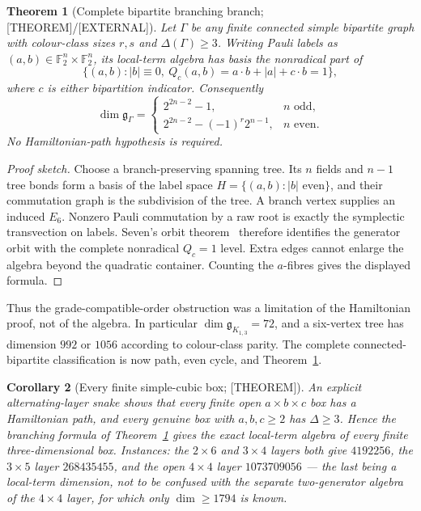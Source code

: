 \documentclass[11pt]{article}
\newtheorem{theorem}{Theorem}[section]
\newtheorem{corollary}[theorem]{Corollary}
\theoremstyle{definition}
\newcommand{\Fb}{\mathbb{F}}
\newcommand{\alg}{\mathfrak{g}}
\begin{document}
\begin{theorem}[Complete bipartite branching branch; {[THEOREM]}/{[EXTERNAL]}]\label{thm:bipcomplete}
Let $\Gamma$ be any finite connected simple bipartite graph with colour-class sizes $r,s$ and
$\Delta(\Gamma)\ge3$. Writing Pauli labels as $(a,b)\in\Fb_2^n\times\Fb_2^n$, its local-term
algebra has basis the nonradical part of
\[
\{(a,b): |b|\equiv0,\ Q_c(a,b)=a\cdot b+|a|+c\cdot b=1\},
\]
where $c$ is either bipartition indicator. Consequently
\[
\dim\alg_\Gamma=
\begin{cases}
2^{2n-2}-1,&n\text{ odd},\\
2^{2n-2}-(-1)^r2^{n-1},&n\text{ even}.
\end{cases}
\]
No Hamiltonian-path hypothesis is required.
\end{theorem}

\begin{proof}[Proof sketch]
Choose a branch-preserving spanning tree. Its $n$ fields and $n-1$ tree bonds form a basis of the
label space $H=\{(a,b):|b|\text{ even}\}$, and their commutation graph is the subdivision of the
tree. A branch vertex supplies an induced $E_6$. Nonzero Pauli commutation by a raw root is exactly
the symplectic transvection on labels. Seven's orbit theorem~\cite{seven2003_transvections} therefore
identifies the generator orbit with the complete nonradical $Q_c=1$ level. Extra edges cannot enlarge
the algebra beyond the quadratic container. Counting the $a$-fibres gives the displayed formula.
\end{proof}

Thus the grade-compatible-order obstruction was a limitation of the Hamiltonian proof, not of the
algebra. In particular $\dim\alg_{K_{1,3}}=72$, and a six-vertex tree has dimension $992$ or $1056$
according to colour-class parity. The complete connected-bipartite classification is now path,
even cycle, and Theorem~\ref{thm:bipcomplete}.

\begin{corollary}[Every finite simple-cubic box; {[THEOREM]}]\label{cor:box}
An explicit alternating-layer snake shows that every finite open $a\times b\times c$ box has a
Hamiltonian path, and every genuine box with $a,b,c\ge2$ has $\Delta\ge3$. Hence the branching
formula of Theorem~\ref{thm:bipcomplete} gives the exact local-term algebra of every finite
three-dimensional box. Instances: the $2\times6$ and $3\times4$ layers both give $4192256$, the
$3\times5$ layer $268435455$, and the open $4\times4$ layer $1073709056$ --- the last being a
local-term dimension, not to be confused with the separate two-generator algebra of the $4\times4$
layer, for which only $\dim\ge1794$ is known.
\end{corollary}
\end{document}
